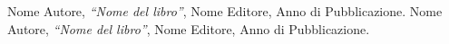 

\begin{thebibliography}{9}
            Nome Autore,
            \emph{``Nome del libro''},
            Nome Editore, Anno di Pubblicazione.
            Nome Autore,
            \emph{``Nome del libro''},
            Nome Editore, Anno di Pubblicazione.
\end{thebibliography}